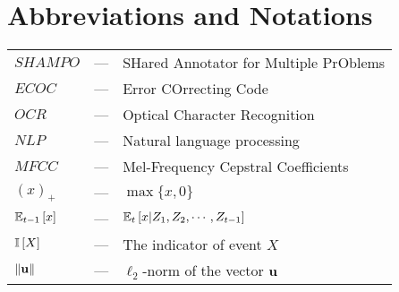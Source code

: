 \documentclass[MSc,afterExam]{iitcsthesis}
\begin{document}


\chapter*{Abbreviations and Notations}
\begin{tabular}{lcl}
$SHAMPO$ & --- & SHared Annotator for Multiple PrOblems\\
$ECOC$ & --- & Error COrrecting Code\\
$OCR$ & --- & Optical Character Recognition\\
$NLP$ & --- & Natural language processing\\
$MFCC$ & --- & Mel-Frequency Cepstral Coefficients\\
$(x)_+$ & --- & $\max\{x,0\}$\\
$\mathbb{E}_{t-1}\left[{x}\right]$ & --- & $\mathbb{E}_{t}\left[{x|Z_1,Z_2,\cdots,Z_{t-1}}\right]$\\
$\mathbb{I}\left[{X}\right]$ & --- & The indicator of event $X$\\
$\Vert\mathbf{u} \Vert$ & --- & $\ell_2$-norm of the vector $\mathbf{u}$\\
\end{tabular}


\allowdisplaybreaks[1]












\clearpage
%



%

\end{document}
